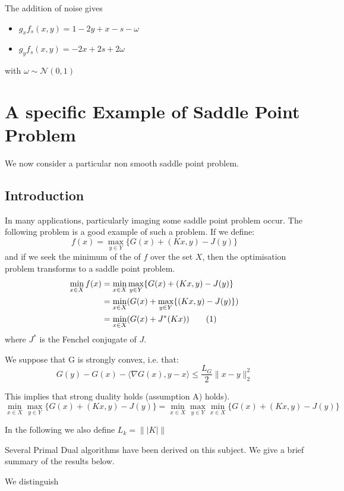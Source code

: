 \documentclass[12pt,reqno]{amsart}
\numberwithin{equation}{section}
\newcommand\numberthis{\addtocounter{equation}{1}\tag{\theequation}}
\begin{document}
The addition of noise gives

\begin{itemize}
\item $g_{x} f_{s}(x,y) = 1 - 2y + x - s - \omega$
\item $g_{y} f_{s}(x,y) = -2x + 2s + 2\omega$
\end{itemize}

with $\omega \sim \mathcal{N}(0,1)$

\section{ A specific Example of Saddle Point Problem}

We now consider a particular  non smooth saddle point problem.

\subsection{Introduction}

In many applications, particularly imaging some saddle point problem occur. The following problem is a good example of such a problem.
If we define:
$$
f(x) = \max_{y \in Y} \{ G(x) + (Kx,y) - J(y) \} 
$$
and if we seek the minimum of the of $f$ over the set $X$, then the optimisation problem transforms to a saddle point problem.
\begin{align*}
\min_{x \in X} f(x) &= \min_{x \in X}\max_{y \in Y} \{ G(x) + (Kx,y) - J(y)\} \\
&= \min_{x \in X} (G(x) + \max_{y \in Y} \{  (Kx,y) - J(y)\})\\
&= \min_{x \in X} (G(x) + J^{*}(Kx)) \numberthis \label{SPPpart}
\end{align*}
where $J^{*}$ is the Fenchel conjugate of $J$.

We suppose that G is strongly convex, i.e. that:
$$
G(y) - G(x) - \langle \nabla G(x),y - x\rangle \leq \dfrac{L_{G}}{2} \lVert x - y \rVert_{2}^{2}
$$

This implies that strong duality holds (assumption A) holds).
$$
\min_{x \in X}\max_{y \in Y} \{ G(x) + (Kx,y) - J(y)\} = \min_{x \in X}\max_{y \in Y}\min_{x \in X} \{ G(x) + (Kx,y) - J(y)\}
$$


In the following we also define $\boxed{ L_{k} = \lVert| K |\rVert }$

Several Primal Dual algorithms have been derived on this subject.
We give a brief summary of the results below.

We distinguish 
\end{document}
